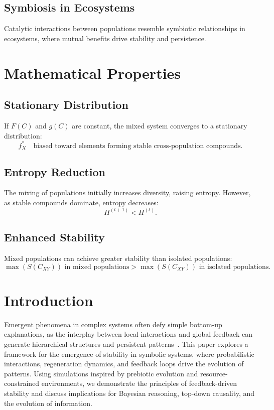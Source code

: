 \documentclass[entropy,article,submit,pdftex,moreauthors]{Definitions/mdpi}
\begin{document}
\subsection*{Symbiosis in Ecosystems}
Catalytic interactions between populations resemble symbiotic relationships in ecosystems, where mutual benefits drive stability and persistence.

\section{Mathematical Properties}

\subsection*{Stationary Distribution}
If \( F(C) \) and \( g(C) \) are constant, the mixed system converges to a stationary distribution:
\[
f_X^* \quad \text{biased toward elements forming stable cross-population compounds.}
\]

\subsection*{Entropy Reduction}
The mixing of populations initially increases diversity, raising entropy. However, as stable compounds dominate, entropy decreases:
\[
H^{(t+1)} < H^{(t)}.
\]

\subsection*{Enhanced Stability}
Mixed populations can achieve greater stability than isolated populations:
\[
\max(S(C_{XY})) \text{ in mixed populations} > \max(S(C_{XY})) \text{ in isolated populations.}
\]

\section{Introduction}

Emergent phenomena in complex systems often defy simple bottom-up explanations, as the interplay between local interactions and global feedback can generate hierarchical structures and persistent patterns~\cite{anderson1972more}. This paper explores a framework for the emergence of stability in symbolic systems, where probabilistic interactions, regeneration dynamics, and feedback loops drive the evolution of patterns. Using simulations inspired by prebiotic evolution and resource-constrained environments, we demonstrate the principles of feedback-driven stability and discuss implications for Bayesian reasoning, top-down causality, and the evolution of information.
\end{document}
